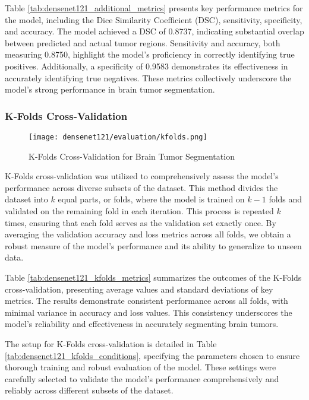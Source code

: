 Table \ref{tab:densenet121_additional_metrics} presents key performance metrics for the model, including the Dice Similarity Coefficient (DSC), sensitivity, specificity, and accuracy. The model achieved a DSC of 0.8737, indicating substantial overlap between predicted and actual tumor regions. Sensitivity and accuracy, both measuring 0.8750, highlight the model's proficiency in correctly identifying true positives. Additionally, a specificity of 0.9583 demonstrates its effectiveness in accurately identifying true negatives. These metrics collectively underscore the model's strong performance in brain tumor segmentation.

\subsubsection{K-Folds Cross-Validation}

\begin{figure}[H]
  \begin{center}
    \texttt{[image: densenet121/evaluation/kfolds.png]}
  \end{center}
  \caption{K-Folds Cross-Validation for Brain Tumor Segmentation}\label{f:densenet121_kfolds}
\end{figure}

K-Folds cross-validation was utilized to comprehensively assess the model's performance across diverse subsets of the dataset. This method divides the dataset into $k$ equal parts, or folds, where the model is trained on $k−1$ folds and validated on the remaining fold in each iteration. This process is repeated $k$ times, ensuring that each fold serves as the validation set exactly once. By averaging the validation accuracy and loss metrics across all folds, we obtain a robust measure of the model's performance and its ability to generalize to unseen data.

Table \ref{tab:densenet121_kfolds_metrics} summarizes the outcomes of the K-Folds cross-validation, presenting average values and standard deviations of key metrics. The results demonstrate consistent performance across all folds, with minimal variance in accuracy and loss values. This consistency underscores the model's reliability and effectiveness in accurately segmenting brain tumors.

The setup for K-Folds cross-validation is detailed in Table \ref{tab:densenet121_kfolds_conditions}, specifying the parameters chosen to ensure thorough training and robust evaluation of the model. These settings were carefully selected to validate the model's performance comprehensively and reliably across different subsets of the dataset.

